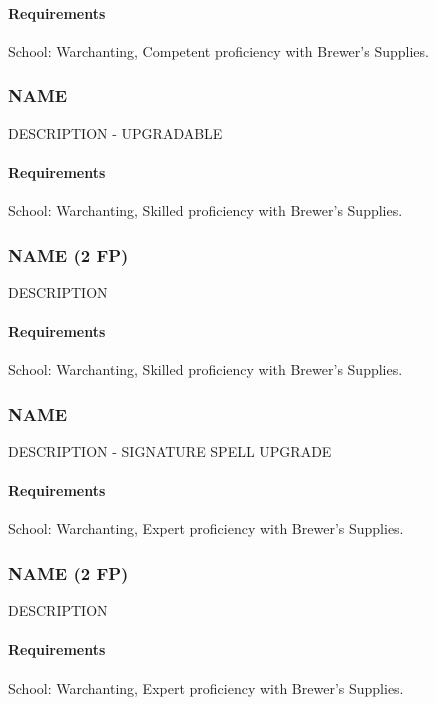     \paragraph{Requirements} School: Warchanting, Competent proficiency with Brewer's Supplies.
\subsubsection{NAME} \label{feat::name}
    DESCRIPTION - UPGRADABLE
    \paragraph{Requirements} School: Warchanting, Skilled proficiency with Brewer's Supplies.
\subsubsection{NAME (2 FP)} \label{feat::name}
    DESCRIPTION
    \paragraph{Requirements} School: Warchanting, Skilled proficiency with Brewer's Supplies.
\subsubsection{NAME} \label{feat::name}
    DESCRIPTION - SIGNATURE SPELL UPGRADE
    \paragraph{Requirements} School: Warchanting, Expert proficiency with Brewer's Supplies.
\subsubsection{NAME (2 FP)} \label{feat::name}
    DESCRIPTION
    \paragraph{Requirements} School: Warchanting, Expert proficiency with Brewer's Supplies.

\newpage
